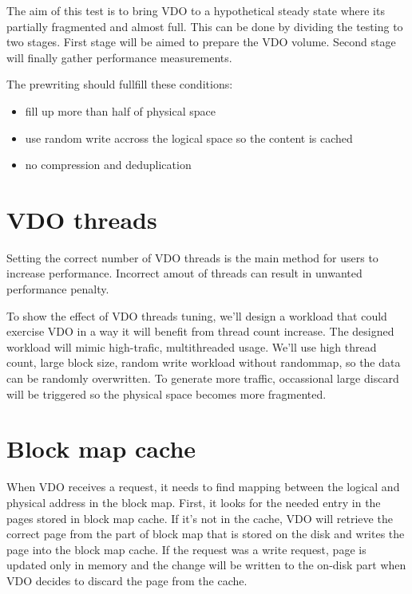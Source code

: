 \documentclass[
  color, %
  table, %
  lof,   %
  lot,   %
]{fithesis3}
\begin{document}
The aim of this test is to bring VDO to a hypothetical steady state where its partially fragmented and almost full. This can be done by dividing the testing to two stages. First stage will be aimed to prepare the VDO volume. Second stage will finally gather performance measurements.

The prewriting should fullfill these conditions:
\begin{itemize}
    \item fill up more than half of physical space
    \item use random write accross the logical space so the content is cached
    \item no compression and deduplication
\end{itemize}


\section{VDO threads}
Setting the correct number of VDO threads is the main method for users to increase performance. Incorrect amout of threads can result in unwanted performance penalty.

To show the effect of VDO threads tuning, we'll design a workload that could exercise VDO in a way it will benefit from thread count increase. The designed workload will mimic high-trafic, multithreaded usage. We'll use high thread count, large block size, random write workload without randommap, so the data can be randomly overwritten. To generate more traffic, occassional large discard will be triggered so the physical space becomes more fragmented.




\section{Block map cache}

When VDO receives a request, it needs to find mapping between the logical and physical address in the block map. First, it looks for the needed entry in the pages stored in block map cache. If it's not in the cache, VDO will retrieve the correct page from the part of block map that is stored on the disk and writes the page into the block map cache. If the request was a write request, page is updated only in memory and the change will be written to the on-disk part when VDO decides to discard the page from the cache.
\end{document}
